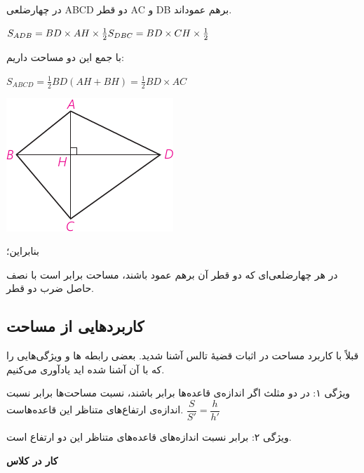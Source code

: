 \documentclass[12pt, a4paper]{book}
\begin{document}
\begin{minipage}{0.65\textwidth}
	در چهارضلعی ABCD دو قطر AC و DB برهم عموداند.
	\begin{flushleft}
		$ S_{ADB} = BD \times AH \times \frac12 \hfill S_{DBC} = BD \times CH \times \frac12 $
	\end{flushleft}
	با جمع این دو مساحت داریم:
	\begin{flushleft}
		$S_{ABCD} = \frac12 BD (AH + BH) = \frac12 BD \times AC$
	\end{flushleft}
\end{minipage}
\begin{minipage}{0.3\textwidth}
	\begin{flushleft}
		\includegraphics{"Shapes/Fasl - 3/Dars 2/P65-S4"}
	\end{flushleft}
\end{minipage}

بنابراین؛

در هر چهارضلعی‌ای که دو قطر آن برهم عمود باشند، مساحت برابر است با نصف حاصل ضرب دو قطر.

\subsection{کاربردهایی از مساحت}

قبلاً با کاربرد مساحت در اثبات قضیهٔ تالس آشنا شدید. بعضی رابطه ها و ویژگی‌هایی را که با آن آشنا شده اید یادآوری می‌کنیم.
\bigskip

{\semibold ویژگی ۱}:
در دو مثلث اگر اندازه‌ی قاعده‌ها برابر باشند، نسبت مساحت‌ها برابر نسبت اندازه‌ی ارتفاع‌های متناظر این قاعده‌هاست. \hfill
		$
			\dfrac{S}{S'} = \dfrac{h}{h'}
		$



 \bigskip

{\semibold ویژگی ۲}:
 برابر نسبت اندازه‌های قاعده‌های متناظر این دو ارتفاع است.
 \bigskip
 
 \textbf{کار در کلاس}
 
\end{document}

